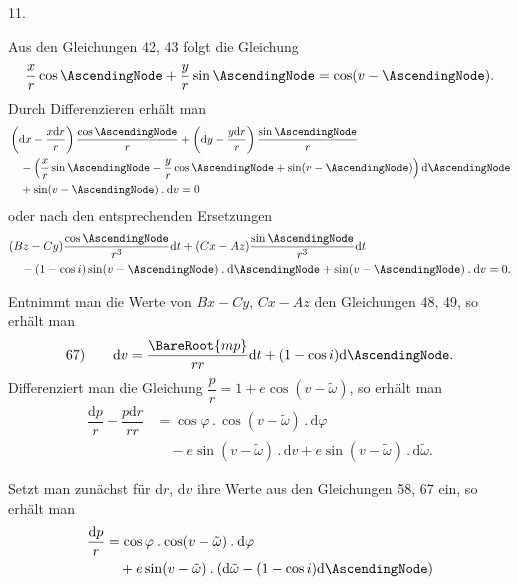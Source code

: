 \par{}\bigskip
{}
\begin{center}11.\end{center}
\noindent\hspace*{\parindent}Aus den Gleichungen 42, 43 folgt die Gleichung
\[
\dfrac{x}{r}\cos\AscendingNode+\dfrac{y}{r}\sin\AscendingNode=\cos(v-\AscendingNode).
\]
Durch Differenzieren erhält man
\[
\begin{aligned}
&\left(\mathrm{d}x-\dfrac{x\mathrm{d}r}{r}\right)\dfrac{\cos\AscendingNode}{r}+\left(\mathrm{d}y-\dfrac{y\mathrm{d}r}{r}\right)\dfrac{\sin\AscendingNode}{r}\\
&\quad-\left(\dfrac{x}{r}\sin\AscendingNode-\dfrac{y}{r}\cos\AscendingNode+\sin(v-\AscendingNode)\right)\mathrm{d}\AscendingNode\\
&\quad+\sin(v-\AscendingNode)\mathbin{.}\mathrm{d}v=0
\end{aligned}
\]
oder nach den entsprechenden Ersetzungen
\[
\begin{aligned}
&(Bz-Cy)\dfrac{\cos\AscendingNode}{r^3}\mathrm{d}t+(Cx-Az)\dfrac{\sin\AscendingNode}{r^3}\mathrm{d}t\\
&\quad-(1-\cos i)\sin(v-\AscendingNode)\mathbin{.}\mathrm{d}\AscendingNode+\sin(v-\AscendingNode)\mathbin{.}\mathrm{d}v=0.
\end{aligned}
\]
\par Entnimmt man die Werte von \(Bx-Cy\), \(Cx-Az\) den Gleichungen 48, 49, so erhält man
\[
\begin{array}{rl}
67)\quad&\mathrm{d}v=\dfrac{\BareRoot{mp}}{rr}\mathrm{d}t+(1-\cos i)\mathrm{d}\AscendingNode.
\end{array}
\]
Differenziert man die Gleichung \(\dfrac{p}{r}=1+e\cos(v-\tilde\omega)\), so erhält man
\[
\begin{aligned}
\dfrac{\mathrm{d}p}{r}-\dfrac{p\mathrm{d}r}{rr}&=\cos\varphi\mathbin{.}\cos(v-\tilde\omega)\mathbin{.}\mathrm{d}\varphi\\
&\quad-e\sin(v-\tilde\omega)\mathbin{.}\mathrm{d}v+e\sin(v-\tilde\omega)\mathbin{.}\mathrm{d}\tilde\omega.
\end{aligned}
\]
\par Setzt man zunächst für \(\mathrm{d}r\), \(\mathrm{d}v\) ihre Werte aus den Gleichungen 58, 67 ein, so erhält man
\[
\begin{aligned}
\dfrac{\mathrm{d}p}{r}&=\cos\varphi\mathbin{.}\cos(v-\tilde\omega)\mathbin{.}\mathrm{d}\varphi\\
&\quad+e\sin(v-\tilde\omega)\mathbin{.}(\mathrm{d}\tilde\omega-(1-\cos i)\mathrm{d}\AscendingNode)
\end{aligned}
\]
